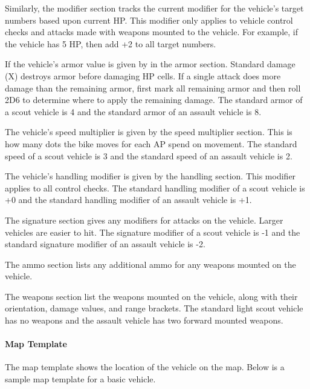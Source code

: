 Similarly, the modifier section tracks the current modifier for the vehicle's target numbers based upon current HP.
This modifier only applies to vehicle control checks and attacks made with weapons mounted to the vehicle.
For example, if the vehicle has 5 HP, then add +2 to all target numbers.

If the vehicle's armor value is given by in the armor section.
Standard damage (X) destroys armor before damaging HP cells.
If a single attack does more damage than the remaining armor, first mark all remaining armor and then roll 2D6 to determine where to apply the remaining damage.
The standard armor of a scout vehicle is 4 and the standard armor of an assault vehicle is 8.

The vehicle's speed multiplier is given by the speed multiplier section.
This is how many dots the bike moves for each AP spend on movement.
The standard speed of a scout vehicle is 3 and the standard speed of an assault vehicle is 2.

The vehicle's handling modifier is given by the handling section.
This modifier applies to all control checks.
The standard handling modifier of a scout vehicle is +0 and the standard handling modifier of an assault vehicle is +1.

The signature section gives any modifiers for attacks on the vehicle.
Larger vehicles are easier to hit.
The signature modifier of a scout vehicle is -1 and the standard signature modifier of an assault vehicle is -2.

The ammo section lists any additional ammo for any weapons mounted on the vehicle.

The weapons section list the weapons mounted on the vehicle, along with their orientation, damage values, and range brackets.
The standard light scout vehicle has no weapons and the assault vehicle has two forward mounted weapons.

\paragraph*{Map Template}

The map template shows the location of the vehicle on the map.
Below is a sample map template for a basic vehicle.

